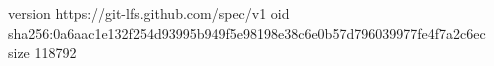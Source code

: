 version https://git-lfs.github.com/spec/v1
oid sha256:0a6aac1e132f254d93995b949f5e98198e38c6e0b57d796039977fe4f7a2c6ec
size 118792
